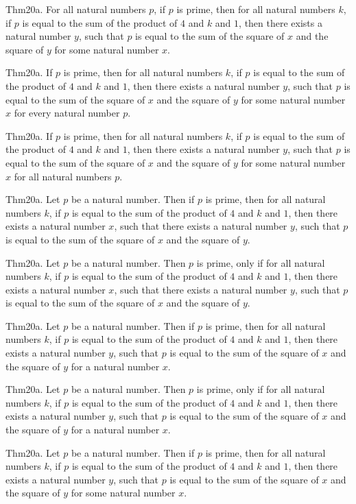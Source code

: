 \documentclass{article}
\begin{document}
Thm20a. For all natural numbers $p$, if $p$ is prime, then for all natural numbers $k$, if $p$ is equal to the sum of the product of $4$ and $k$ and $1$, then there exists a natural number $y$, such that $p$ is equal to the sum of the square of $x$ and the square of $y$ for some natural number $x$.

Thm20a. If $p$ is prime, then for all natural numbers $k$, if $p$ is equal to the sum of the product of $4$ and $k$ and $1$, then there exists a natural number $y$, such that $p$ is equal to the sum of the square of $x$ and the square of $y$ for some natural number $x$ for every natural number $p$.

Thm20a. If $p$ is prime, then for all natural numbers $k$, if $p$ is equal to the sum of the product of $4$ and $k$ and $1$, then there exists a natural number $y$, such that $p$ is equal to the sum of the square of $x$ and the square of $y$ for some natural number $x$ for all natural numbers $p$.

Thm20a. Let $p$ be a natural number. Then if $p$ is prime, then for all natural numbers $k$, if $p$ is equal to the sum of the product of $4$ and $k$ and $1$, then there exists a natural number $x$, such that there exists a natural number $y$, such that $p$ is equal to the sum of the square of $x$ and the square of $y$.

Thm20a. Let $p$ be a natural number. Then $p$ is prime, only if for all natural numbers $k$, if $p$ is equal to the sum of the product of $4$ and $k$ and $1$, then there exists a natural number $x$, such that there exists a natural number $y$, such that $p$ is equal to the sum of the square of $x$ and the square of $y$.

Thm20a. Let $p$ be a natural number. Then if $p$ is prime, then for all natural numbers $k$, if $p$ is equal to the sum of the product of $4$ and $k$ and $1$, then there exists a natural number $y$, such that $p$ is equal to the sum of the square of $x$ and the square of $y$ for a natural number $x$.

Thm20a. Let $p$ be a natural number. Then $p$ is prime, only if for all natural numbers $k$, if $p$ is equal to the sum of the product of $4$ and $k$ and $1$, then there exists a natural number $y$, such that $p$ is equal to the sum of the square of $x$ and the square of $y$ for a natural number $x$.

Thm20a. Let $p$ be a natural number. Then if $p$ is prime, then for all natural numbers $k$, if $p$ is equal to the sum of the product of $4$ and $k$ and $1$, then there exists a natural number $y$, such that $p$ is equal to the sum of the square of $x$ and the square of $y$ for some natural number $x$.
\end{document}

